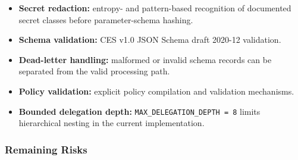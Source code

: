 \documentclass[11pt,a4paper]{article}
\begin{document}
\begin{itemize}[leftmargin=1.4em]

\item \textbf{Secret redaction:} entropy- and pattern-based recognition of documented
secret classes before parameter-schema hashing.

\item \textbf{Schema validation:} CES v1.0 JSON Schema draft 2020-12 validation.

\item \textbf{Dead-letter handling:} malformed or invalid schema records can be separated
from the valid processing path.

\item \textbf{Policy validation:} explicit policy compilation and validation mechanisms.

\item \textbf{Bounded delegation depth:}
\texttt{MAX\_DELEGATION\_DEPTH = 8} limits hierarchical nesting in the current
implementation.

\end{itemize}

\subsubsection*{Remaining Risks}
\end{document}
